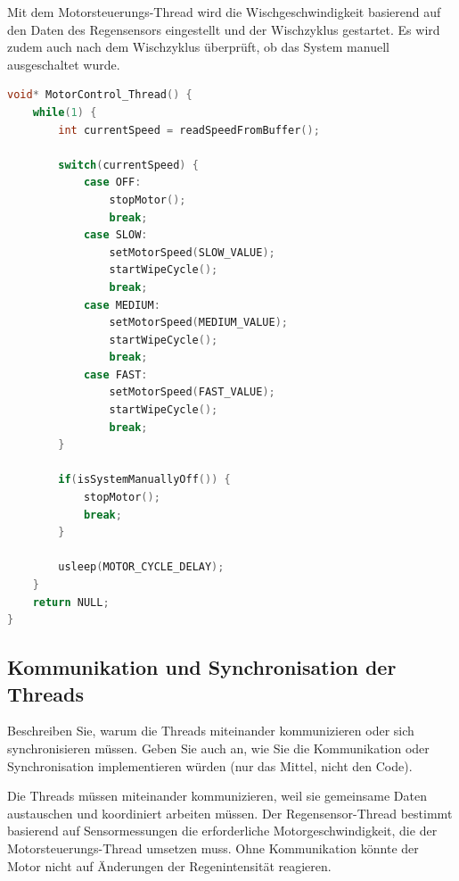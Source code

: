 \documentclass[
%
ngerman %
%
numeric %
]{wbh-assignment}
\begin{document}
\newpage

Mit dem Motorsteuerungs-Thread wird die Wischgeschwindigkeit basierend auf den Daten des Regensensors eingestellt und der Wischzyklus gestartet.
Es wird zudem auch nach dem Wischzyklus überprüft, ob das System manuell ausgeschaltet wurde.

\vspace*{5mm}

\begin{lstlisting}[language=C, caption={Motorsteuerungs-Thread}]
void* MotorControl_Thread() {
    while(1) {
        int currentSpeed = readSpeedFromBuffer();

        switch(currentSpeed) {
            case OFF:
                stopMotor();
                break;
            case SLOW:
                setMotorSpeed(SLOW_VALUE);
                startWipeCycle();
                break;
            case MEDIUM:
                setMotorSpeed(MEDIUM_VALUE);
                startWipeCycle();
                break;
            case FAST:
                setMotorSpeed(FAST_VALUE);
                startWipeCycle();
                break;
        }

        if(isSystemManuallyOff()) {
            stopMotor();
            break;
        }

        usleep(MOTOR_CYCLE_DELAY);
    }
    return NULL;
}
\end{lstlisting}

\newpage

\subsection{Kommunikation und Synchronisation der Threads}
\begin{aufgabenstellung}
Beschreiben Sie, warum die Threads miteinander kommunizieren oder sich synchronisieren müssen. Geben Sie auch an, wie Sie die Kommunikation oder Synchronisation implementieren würden (nur das Mittel, nicht den Code).
\end{aufgabenstellung}

\vspace*{5mm}

Die Threads müssen miteinander kommunizieren, weil sie gemeinsame Daten austauschen und koordiniert arbeiten müssen.
Der Regensensor-Thread bestimmt basierend auf Sensormessungen die erforderliche Motorgeschwindigkeit, die der Motorsteuerungs-Thread umsetzen muss.
Ohne Kommunikation könnte der Motor nicht auf Änderungen der Regenintensität reagieren.
\end{document}
